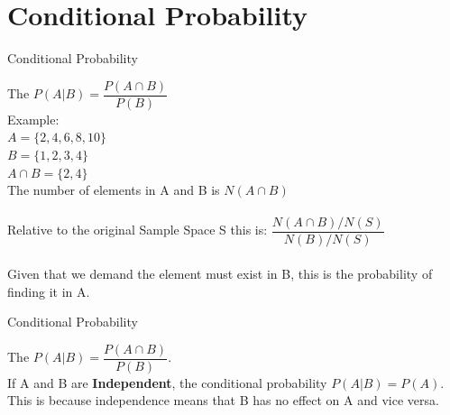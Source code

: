 \documentclass[10pt,sans,english,compress,xcolor=dvipsnames]{beamer}
\begin{document}






 






\section*{Conditional Probability}

\begin{frame}[fragile]{Conditional Probability}

The  $P(A | B) = \dfrac{P(A\cap B)}{P(B)}$\\[1ex]
\small
Example:\\
$A = \{2,4,6,8,10\}$\\
$B = \{1,2,3,4\}$\\
$A\cap B = \{2,4\}$\\

The number of elements in A and B is $N(A \cap B)$\\
\\
Relative to the original Sample Space S this is: $\dfrac{N(A\cap B)/N(S) }{N(B)/N(S)}$\\
\\
Given that we demand the element must exist in B, this is the probability of finding it in A.\\

\end{frame} 



\begin{frame}[fragile]{Conditional Probability}

The  $P(A | B) = \dfrac{P(A\cap B)}{P(B)}$.\\[2ex]

If A and B are \textbf{Independent}, the conditional probability $P(A | B)  = P(A) $.\\[2ex]

This is because independence means that B has no effect on A and vice versa.\\[2ex]


\end{frame} 
\end{document}
